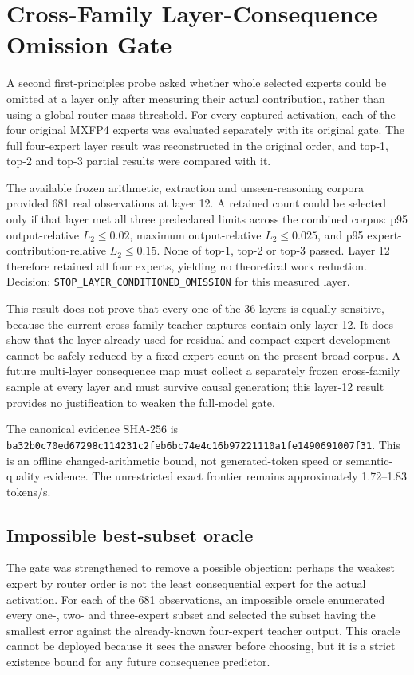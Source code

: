\section{Cross-Family Layer-Consequence Omission Gate}

A second first-principles probe asked whether whole selected experts could be
omitted at a layer only after measuring their actual contribution, rather than
using a global router-mass threshold.  For every captured activation, each of
the four original MXFP4 experts was evaluated separately with its original
gate.  The full four-expert layer result was reconstructed in the original
order, and top-1, top-2 and top-3 partial results were compared with it.

The available frozen arithmetic, extraction and unseen-reasoning corpora
provided 681 real observations at layer 12.  A retained count could be selected
only if that layer met all three predeclared limits across the combined corpus:
p95 output-relative $L_2\leq0.02$, maximum output-relative $L_2\leq0.025$, and
p95 expert-contribution-relative $L_2\leq0.15$.  None of top-1, top-2 or top-3
passed.  Layer 12 therefore retained all four experts, yielding no theoretical
work reduction.  Decision: \texttt{STOP\_LAYER\_CONDITIONED\_OMISSION} for
this measured layer.

This result does not prove that every one of the 36 layers is equally
sensitive, because the current cross-family teacher captures contain only
layer 12.  It does show that the layer already used for residual and compact
expert development cannot be safely reduced by a fixed expert count on the
present broad corpus.  A future multi-layer consequence map must collect a
separately frozen cross-family sample at every layer and must survive causal
generation; this layer-12 result provides no justification to weaken the
full-model gate.

The canonical evidence SHA-256 is
\texttt{ba32b0c70ed67298c114231c2feb6bc74e4c16b97221110a1fe1490691007f31}.
This is an offline changed-arithmetic bound, not generated-token speed or
semantic-quality evidence.  The unrestricted exact frontier remains
approximately 1.72--1.83 tokens/s.

\subsection{Impossible best-subset oracle}

The gate was strengthened to remove a possible objection: perhaps the weakest
expert by router order is not the least consequential expert for the actual
activation.  For each of the 681 observations, an impossible oracle enumerated
every one-, two- and three-expert subset and selected the subset having the
smallest error against the already-known four-expert teacher output.  This
oracle cannot be deployed because it sees the answer before choosing, but it
is a strict existence bound for any future consequence predictor.

